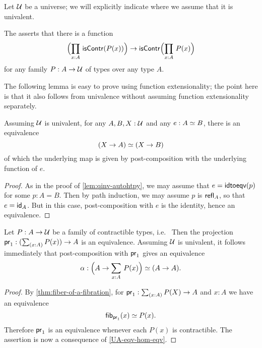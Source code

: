 %
Let $\type$ be a universe; we will explicitly indicate where we assume that it is univalent.

\begin{defn}\label{weakfunext}
The 
%
asserts that there is a function
\begin{equation*}
\Parens{\prd{x:A}\iscontr(P(x))} \to\iscontr\Parens{\prd{x:A}P(x)}
\end{equation*}
for any family $P:A\to\type$ of types over any type $A$.
\end{defn}

The following lemma is easy to prove using function extensionality; the point here is that it also follows from univalence without assuming function extensionality separately.

\begin{lem} \label{UA-eqv-hom-eqv}
Assuming $\type$ is univalent, for any $A,B,X:\type$ and any $e:\eqv{A}{B}$, there is an equivalence
\begin{equation*}
\eqv{(X\to A)}{(X\to B)}
\end{equation*}
of which the underlying map is given by post-composition with the underlying function of $e$.
\end{lem}

\begin{proof}
  As in the proof of \cref{lem:qinv-autohtpy}, we may assume that $e = \idtoeqv(p)$ for some $p:A=B$.
  Then by path induction, we may assume $p$ is $\refl{A}$, so that $e = \idfunc[A]$.
  But in this case, post-composition with $e$ is the identity, hence an equivalence.
\end{proof}

\begin{cor}\label{contrfamtotalpostcompequiv}
Let $P:A\to\type$ be a family of contractible types, i.e.\ 
Then the projection $\proj{1}:(\sm{x:A}P(x))\to A$ is an equivalence. Assuming $\type$ is univalent, it follows immediately that post-composition with $\proj{1}$ gives an equivalence
\begin{equation*}
\alpha : \eqv{\Parens{A\to\sm{x:A}P(x)}}{(A\to A)}.
\end{equation*}
\end{cor}

\begin{proof}
  By \cref{thm:fiber-of-a-fibration}, for $\proj{1}:\sm{x:A}P(X)\to A$ and $x:A$ we have an equivalence
  \begin{equation*}
    \eqv{\hfiber{\proj{1}}{x}}{P(x)}.
  \end{equation*}
  Therefore $\proj{1}$ is an equivalence whenever each $P(x)$ is contractible. The assertion is now a consequence of  \cref{UA-eqv-hom-eqv}.
\end{proof}

